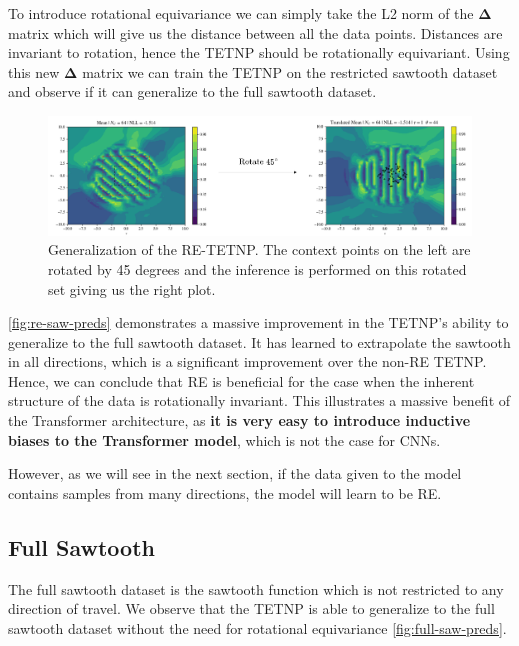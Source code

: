 \documentclass[../../main.tex]{subfiles}
\begin{document}
To introduce rotational equivariance we can simply take the L2 norm of the $\bm{\Delta}$ matrix which will give us the distance between all the data points. Distances are invariant to rotation, hence the TETNP should be rotationally equivariant. Using this new $\bm{\Delta}$ matrix we can train the TETNP on the restricted sawtooth dataset and observe if it can generalize to the full sawtooth dataset.


\begin{figure}[H]
    \centering
    \includegraphics[width=1\linewidth]{./fig/res-saw/re.png}
    \caption{Generalization of the RE-TETNP. The context points on the left are rotated by 45 degrees and  the inference is performed on this rotated set giving us the right plot.}
    \label{fig:re-saw-preds}
\end{figure}

\autoref{fig:re-saw-preds} demonstrates a massive improvement in the TETNP's ability to generalize to the full sawtooth dataset. It has learned to extrapolate the sawtooth in all directions, which is a significant improvement over the non-RE TETNP. Hence, we can conclude that RE is beneficial for the case when the inherent structure of the data is rotationally invariant. This illustrates a massive benefit of the Transformer architecture, as \textbf{it is very easy to introduce inductive biases to the Transformer model}, which is not the case for CNNs.

However, as we will see in the next section, if the data given to the model contains samples from many directions, the model will learn to be RE.

\subsection{Full Sawtooth}

The full sawtooth dataset is the sawtooth function which is not restricted to any direction of travel. We observe that the TETNP is able to generalize to the full sawtooth dataset without the need for rotational equivariance \autoref{fig:full-saw-preds}. 
\end{document}
